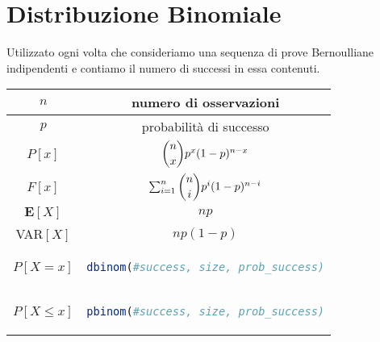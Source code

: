 \section{Distribuzione Binomiale}
\begin{tcolorbox}
Utilizzato ogni volta che consideriamo una sequenza di prove Bernoulliane indipendenti e contiamo il numero di successi in essa contenuti.
\end{tcolorbox}
\begingroup
\setlength{\tabcolsep}{10pt} %
\renewcommand{\arraystretch}{1.5} %
\begin{center}
\begin{tabular}{ |c|c| } 
\hline
\(n\) & numero di osservazioni \\ \hline
\(p\) & probabilità di successo \\ \hline
\(P[x]\) & $\dbinom{n}{x} p^x(1-p)^{n - x}$\\ \hline
\(F[x]\) & $\sum_{i = 1}^n \dbinom{n}{i} p^i(1 - p)^{n-i}$ \\ \hline
\(\mathbf{E}[X]\) & \(np\) \\ \hline
VAR\([X]\) & \(np(1 - p)\) \\ \hline\hline
\(P[X = x]\) & \begin{lstlisting}[language=R]
dbinom(#success, size, prob_success)
\end{lstlisting} \\ \hline
\(P[X \leq x]\) & \begin{lstlisting}[language=R]
pbinom(#success, size, prob_success)
\end{lstlisting} \\ \hline
\end{tabular}
\end{center}
\endgroup




